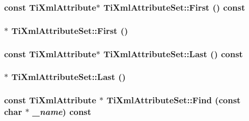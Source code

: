 \subsubsection{\setlength{\rightskip}{0pt plus 5cm}const {\bf TiXmlAttribute}$\ast$ TiXmlAttributeSet::First () const\hspace{0.3cm}{\tt  [inline]}}\label{classTiXmlAttributeSet_e0636e88cedd4b09d61c451860f68598}


\subsubsection{$\ast$ TiXmlAttributeSet::First ()\hspace{0.3cm}{\tt  [inline]}}\label{classTiXmlAttributeSet_99703bb08ca2aece2d7ef835de339ba0}


\subsubsection{\setlength{\rightskip}{0pt plus 5cm}const {\bf TiXmlAttribute}$\ast$ TiXmlAttributeSet::Last () const\hspace{0.3cm}{\tt  [inline]}}\label{classTiXmlAttributeSet_7b3f3ccf39a97bc25539d3fcc540296a}


\subsubsection{$\ast$ TiXmlAttributeSet::Last ()\hspace{0.3cm}{\tt  [inline]}}\label{classTiXmlAttributeSet_b4c4edfb2d74f6ea31aae096743bd6e0}


\subsubsection{\setlength{\rightskip}{0pt plus 5cm}const {\bf TiXmlAttribute} $\ast$ TiXmlAttributeSet::Find (const char $\ast$ {\em \_\-name}) const}\label{classTiXmlAttributeSet_acbbc5e1a1c987e72815430e89fcb58b}


